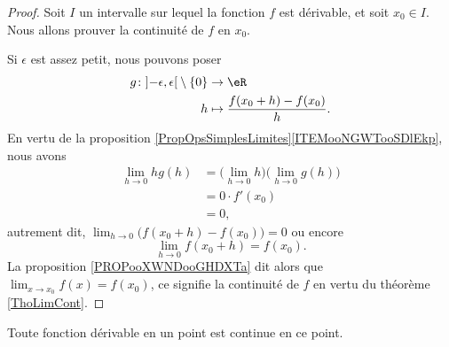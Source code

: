 \begin{proof}
	Soit \( I\) un intervalle sur lequel la fonction \( f\) est dérivable, et soit \( x_0\in I\). Nous allons prouver la continuité de \( f\) en \( x_0\).

	Si \( \epsilon\) est assez petit, nous pouvons poser
	\begin{equation}
		\begin{aligned}
			g\colon \mathopen] -\epsilon,\epsilon\mathclose[\setminus\{ 0 \} & \to \eR                                   \\
			h                                                                & \mapsto    \frac{ f(x_0+h)-f(x_0) }{ h }.
		\end{aligned}
	\end{equation}
	En vertu de la proposition \ref{PropOpsSimplesLimites}\ref{ITEMooNGWTooSDlEkp}, nous avons
	\begin{subequations}
		\begin{align}
			\lim_{h\to0}hg(h) & =\big(\lim_{h\to 0}h\big)\big(\lim_{h\to 0}g(h)\big) \\
			                  & =0\cdot f'(x_0)                                      \\
			                  & =0,
		\end{align}
	\end{subequations}
	autrement dit, \( \lim_{h\to 0}\big( f(x_0+h)-f(x_0) \big)=0\) ou encore
	\begin{equation}
		\lim_{h\to 0}f(x_0+h)=f(x_0).
	\end{equation}
	La proposition \ref{PROPooXWNDooGHDXTa} dit alors que \( \lim_{x\to x_0}f(x)=f(x_0)\), ce signifie la continuité de \( f\) en vertu du théorème \ref{ThoLimCont}.
\end{proof}

\begin{theorem} \label{THOooFFOZooCYGets}
	Toute fonction dérivable en un point est continue en ce point.
\end{theorem}

